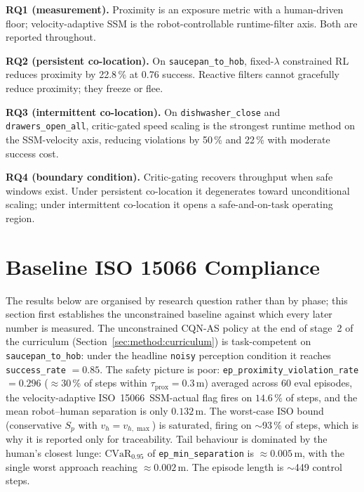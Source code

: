 \documentclass[11pt,a4paper]{report}
\newcommand{\ssm}{SSM}
\newcommand{\iso}{ISO~15066}
\newcommand{\cvar}{\ensuremath{\mathrm{CVaR}}}
\newcommand{\cqnas}{CQN-AS}
\begin{document}
\textbf{RQ1 (measurement).} Proximity is an exposure metric with a
human-driven floor; velocity-adaptive \ssm{} is the robot-controllable
runtime-filter axis. Both are reported throughout.

\textbf{RQ2 (persistent co-location).} On \texttt{saucepan\_to\_hob},
fixed-$\lambda$ constrained RL reduces proximity by 22.8\,\% at 0.76
success. Reactive filters cannot gracefully reduce proximity; they
freeze or flee.

\textbf{RQ3 (intermittent co-location).} On
\texttt{dishwasher\_close} and \texttt{drawers\_open\_all},
critic-gated speed scaling is the strongest runtime method on the
SSM-velocity axis, reducing violations by 50\,\% and 22\,\% with
moderate success cost.

\textbf{RQ4 (boundary condition).} Critic-gating recovers throughput
when safe windows exist. Under persistent co-location it degenerates
toward unconditional scaling; under intermittent co-location it opens a
safe-and-on-task operating region.

\iffalse

\section{Baseline ISO 15066 Compliance}
\label{sec:results:baseline}

The results below are organised by research question rather than by
phase; this section first establishes the unconstrained baseline
against which every later number is measured. The unconstrained
\cqnas{} policy at the end of stage~2 of the
curriculum (Section~\ref{sec:method:curriculum}) is task-competent
on \texttt{saucepan\_to\_hob}: under the headline \texttt{noisy}
perception condition it reaches \texttt{success\_rate} $= 0.85$.
The safety picture is poor: \texttt{ep\_proximity\_violation\_rate}
$= 0.296$ ($\approx$30\,\% of steps within $\tau_{\mathrm{prox}} =
0.3$\,m) averaged across 60 eval episodes, the velocity-adaptive
\iso{}~\ssm{}-actual flag fires on $14.6\,\%$ of steps, and the mean
robot--human separation is only $0.132$\,m. The worst-case ISO bound
(conservative $S_p$ with $v_h = v_{h,\max}$) is saturated, firing on
$\sim$93\,\% of steps, which is why it is reported only for
traceability. Tail behaviour is dominated by the human's closest
lunge: $\cvar_{0.95}$ of \texttt{ep\_min\_separation} is
$\approx 0.005$\,m, with the single worst approach reaching
$\approx 0.002$\,m. The episode length is $\sim$449 control steps.
\end{document}
